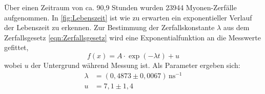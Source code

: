         \FloatBarrier

        Über einen Zeitraum von ca. 90,9 Stunden wurden 23944 Myonen-Zerfälle aufgenommen. In \autoref{fig:Lebenszeit} ist wie zu erwarten ein exponentieller Verlauf der Lebenszeit zu erkennen. Zur Bestimmung der Zerfallskonstante $\lambda$ aus dem Zerfallsgesetz \eqref{eqn:Zerfallsgesetz} wird eine Exponentialfunktion an die Messwerte gefittet,
        \begin{equation*}
            f(x) = A \cdot \exp\left(-\lambda t\right) + u
        \end{equation*}
        wobei $u$ der Untergrund während Messung ist. Als Parameter ergeben sich:
        \begin{align*}
            \lambda &= (0,4873 \pm 0,0067) \, \text{ns}^{-1} \\
            u &= 7,1 \pm 1,4
        \end{align*}



















































